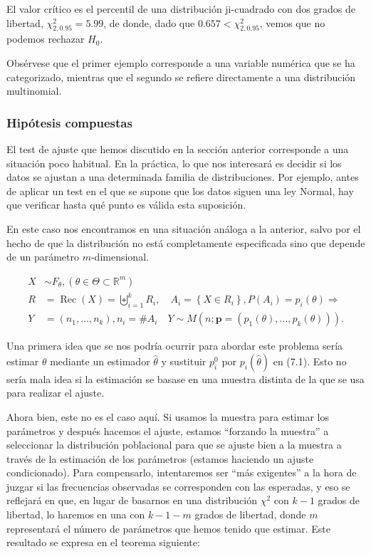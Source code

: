 \documentclass[
]{article}
\begin{document}
El valor crítico es el percentil de una distribución ji-cuadrado con dos grados de libertad, \(\chi_{2,0.95}^{2}=5.99\), de donde, dado que \(0.657<\chi_{2,0.95}^{2}\), vemos que no podemos rechazar \(H_{0}\).

Obsérvese que el primer ejemplo corresponde a una variable numérica que se ha categorizado, mientras que el segundo se refiere directamente a una distribución multinomial.

\subsubsection{Hipótesis compuestas}\label{hipuxf3tesis-compuestas}

El test de ajuste que hemos discutido en la sección anterior corresponde a una situación poco habitual. En la práctica, lo que nos interesará es decidir si los datos se ajustan a una determinada familia de distribuciones. Por ejemplo, antes de aplicar un test en el que se supone que los datos siguen una ley Normal, hay que verificar hasta qué punto es válida esta suposición.

En este caso nos encontramos en una situación análoga a la anterior, salvo por el hecho de que la distribución no está completamente especificada sino que depende de un parámetro \(m\)-dimensional.

\[
\begin{aligned}
X & \sim F_{\theta},\left(\theta \in \Theta \subset \mathbb{R}^{m}\right) \\
R & =\operatorname{Rec}(X)=\biguplus_{i=1}^{k} R_{i}, \quad A_{i}=\left\{X \in R_{i}\right\}, P\left(A_{i}\right)=p_{i}(\theta) \Longrightarrow \\
Y & =\left(n_{1}, \ldots, n_{k}\right), n_{i}=\# A_{i} \quad Y \sim M\left(n ; \mathbf{p}=\left(p_{1}(\theta), \ldots, p_{k}(\theta)\right)\right) .
\end{aligned}
\]

Una primera idea que se nos podría ocurrir para abordar este problema sería estimar \(\theta\) mediante un estimador \(\hat{\theta}\) y sustituir \(p_{i}^{0}\) por \(p_{i}(\hat{\theta})\) en (7.1). Esto no sería mala idea si la estimación se basase en una muestra distinta de la que se usa para realizar el ajuste.

Ahora bien, este no es el caso aquí. Si usamos la muestra para estimar los parámetros y después hacemos el ajuste, estamos ``forzando la muestra'' a seleccionar la distribución poblacional para que se ajuste bien a la muestra a través de la estimación de los parámetros (estamos haciendo un ajuste condicionado). Para compensarlo, intentaremos ser ``más exigentes'' a la hora de juzgar si las frecuencias observadas se corresponden con las esperadas, y eso se reflejará en que, en lugar de basarnos en una distribución \(\chi^{2}\) con \(k-1\) grados de libertad, lo haremos en una con \(k-1-m\) grados de libertad, donde \(m\) representará el número de parámetros que hemos tenido que estimar. Este resultado se expresa en el teorema siguiente:
\end{document}
